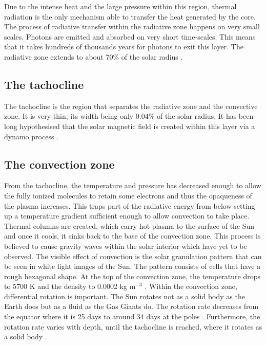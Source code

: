     Due to the intense heat and the large pressure within this region, thermal radiation is the only mechanism able to transfer the heat generated by the core.
    The process of radiative transfer within the radiative zone happens on very small scales.
    Photons are emitted and absorbed on very short time-scales. 
    This means that it takes hundreds of thousands years for photons to exit this layer.
    The radiative zone extends to about 70\% of the solar radius \citep{cox1991solar}. 
        
\subsection{The tachocline}

    The tachocline is the region that separates the radiative zone and the convective zone.
    It is very thin, its width being only 0.04\% of the solar radius.
    It has been long hypothesised that the solar magnetic field is created within this layer via a dynamo process \citep{stix2004sun,soward2005fluid}.

\subsection{The convection zone}

    From the tachocline, the temperature and pressure has decreased enough to allow the fully ionized molecules to retain some electrons and thus the opaqueness of the plasma increases.
    This traps part of the radiative energy from below setting up a temperature gradient sufficient enough to allow convection to take place.
    Thermal columns are created, which carry hot plasma to the surface of the Sun and once it cools, it sinks back to the base of the convection zone.
    This process is believed to cause gravity waves within the solar interior which have yet to be observed.
    The visible effect of convection is the solar granulation pattern that can be seen in white light images of the Sun.  
    The pattern consists of cells that have a rough hexagonal shape. 
    At the top of the convection zone, the temperature drops to 5700 K and the density to 0.0002 kg m$^{-3}$ \citep{gai2000sun}. 
    Within the convection zone, differential rotation is important.
    The Sun rotates not as a solid body as the Earth does but as a fluid as the Gas Giants do. 
    The rotation rate decreases from the equator where it is 25 days to around 34 days at the poles \citep{2000SoPh..191...47B}.
    Furthermore, the rotation rate varies with depth, until the tachocline is reached, where it rotates as a solid body \citep{Howe31032000}.
    
